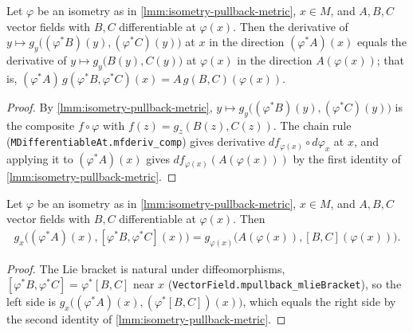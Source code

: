 \begin{lemma}
    \label{lmm:isometry-pullback-metric-derivative}
    \leanok
    Let $\varphi$ be an isometry as in \ref{lmm:isometry-pullback-metric}, $x \in M$, and $A, B, C$ vector fields with $B, C$ differentiable at $\varphi(x)$. Then the derivative of $y \mapsto g_y\big((\varphi^* B)(y), (\varphi^* C)(y)\big)$ at $x$ in the direction $(\varphi^* A)(x)$ equals the derivative of $y \mapsto g_y\big(B(y), C(y)\big)$ at $\varphi(x)$ in the direction $A(\varphi(x))$; that is, $(\varphi^*A)\,g(\varphi^*B, \varphi^*C)(x) = A\,g(B,C)(\varphi(x))$.
\end{lemma}
\begin{proof}
    \leanok
    By \ref{lmm:isometry-pullback-metric}, $y \mapsto g_y\big((\varphi^* B)(y), (\varphi^* C)(y)\big)$ is the composite $f \circ \varphi$ with $f(z) = g_z(B(z), C(z))$. The chain rule (\texttt{MDifferentiableAt.mfderiv\_comp}) gives derivative $df_{\varphi(x)} \circ d\varphi_x$ at $x$, and applying it to $(\varphi^* A)(x)$ gives $df_{\varphi(x)}(A(\varphi(x)))$ by the first identity of \ref{lmm:isometry-pullback-metric}.
\end{proof}

\begin{lemma}
    \label{lmm:isometry-pullback-lie-bracket}
    \leanok
    Let $\varphi$ be an isometry as in \ref{lmm:isometry-pullback-metric}, $x \in M$, and $A, B, C$ vector fields with $B, C$ differentiable at $\varphi(x)$. Then
    \begin{align}
        g_x\big((\varphi^* A)(x), [\varphi^* B, \varphi^* C](x)\big) = g_{\varphi(x)}\big(A(\varphi(x)), [B, C](\varphi(x))\big).
    \end{align}
\end{lemma}
\begin{proof}
    \leanok
    The Lie bracket is natural under diffeomorphisms, $[\varphi^* B, \varphi^* C] = \varphi^*[B, C]$ near $x$ (\texttt{VectorField.mpullback\_mlieBracket}), so the left side is $g_x\big((\varphi^* A)(x), (\varphi^*[B,C])(x)\big)$, which equals the right side by the second identity of \ref{lmm:isometry-pullback-metric}.
\end{proof}

